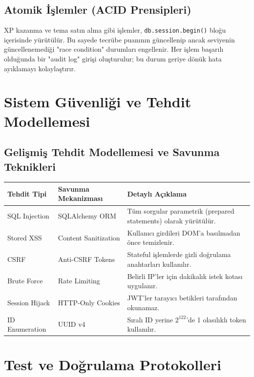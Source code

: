 \documentclass[12pt,a4paper]{article}
\begin{document}
\subsection{Atomik İşlemler (ACID Prensipleri)}
XP kazanma ve tema satın alma gibi işlemler, \texttt{db.session.begin()} bloğu içerisinde yürütülür. Bu sayede tecrübe puanının güncellenip ancak seviyenin güncellenemediği "race condition" durumları engellenir. Her işlem başarılı olduğunda bir "audit log" girişi oluşturulur; bu durum geriye dönük hata ayıklamayı kolaylaştırır.

\section{Sistem Güvenliği ve Tehdit Modellemesi}

\subsection{Gelişmiş Tehdit Modellemesi ve Savunma Teknikleri}
\begin{longtable}{@{} P{3.5cm} P{4cm} P{7cm} @{}}
\toprule
\textbf{Tehdit Tipi} & \textbf{Savunma Mekanizması} & \textbf{Detaylı Açıklama} \\
\midrule
SQL Injection & SQLAlchemy ORM & Tüm sorgular parametrik (prepared statements) olarak yürütülür. \\
Stored XSS & Content Sanitization & Kullanıcı girdileri DOM'a basılmadan önce temizlenir. \\
CSRF & Anti-CSRF Tokens & Stateful işlemlerde gizli doğrulama anahtarları kullanılır. \\
Brute Force & Rate Limiting & Belirli IP'ler için dakikalık istek kotası uygulanır. \\
Session Hijack & HTTP-Only Cookies & JWT'ler tarayıcı betikleri tarafından okunamaz. \\
ID Enumeration & UUID v4 & Sıralı ID yerine $2^{122}$'de 1 olasılıklı token kullanılır. \\
\bottomrule
\end{longtable}

\section{Test ve Doğrulama Protokolleri}
\end{document}
